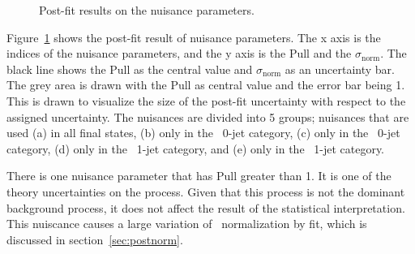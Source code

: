 \begin{figure}[!hbtp]
{}
\caption{Post-fit results on the nuisance parameters.}
\label{fig:postnuisance}
\end{figure}
Figure~\ref{fig:postnuisance} shows the post-fit result of nuisance parameters. 
The x axis is the indices of the nuisance parameters, and the y axis is the 
Pull and the $\sigma_{\textrm{norm}}$. The black line shows the Pull 
as the central value and 
$\sigma_{\textrm{norm}}$ as an uncertainty bar. The grey area is drawn with the Pull as 
central value and the error bar being 1. This is drawn to visualize the size of 
the post-fit uncertainty with respect to the assigned uncertainty. 
The nuisances are divided into 5 groups; nuisances that are used (a) in all final states, 
(b) only in the \DF\ 0-jet category,  (c) only in the \SF\ 0-jet category,  
(d) only in the \DF\ 1-jet category,  and (e) only in the \SF\ 1-jet category. 

There is one nuisance parameter that has Pull greater than 1. 
It is one of the theory uncertainties on the \ggww process. 
Given that this process is not the dominant background process, 
it does not affect the result of the statistical interpretation. 
This nuiscance causes a large variation of \ggww\ normalization by fit,
which is discussed in section~\ref{sec:postnorm}.

